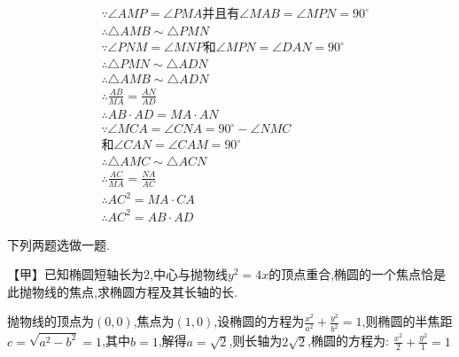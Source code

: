 \begin{questions}
	\begin{solution}
		\begin{align*}
			 & \because \angle{AMP} = \angle{PMA} \text{并且有} \angle{MAB} = \angle{MPN} = 90^\circ \\
			 & \therefore \triangle{AMB} \sim \triangle{PMN}                                      \\
			 & \because \angle{PNM} = \angle{MNP} \text{和} \angle{MPN} = \angle{DAN} = 90^\circ   \\
			 & \therefore \triangle{PMN} \sim \triangle{ADN}                                      \\
			 & \therefore \triangle{AMB} \sim \triangle{ADN}                                      \\
			 & \therefore \frac{AB}{MA} = \frac{AN}{AD}                                           \\
			 & \therefore AB\cdot AD = MA \cdot AN                                                \\
			 & \because \angle{MCA} = \angle{CNA} = 90^\circ - \angle{NMC}                        \\
			 & \text{和} \angle{CAN} = \angle{CAM} = 90^\circ                                      \\
			 & \therefore \triangle{AMC} \sim \triangle{ACN}                                      \\
			 & \therefore \frac{AC}{MA} = \frac{NA}{AC}                                           \\
			 & \therefore AC^2 = MA \cdot CA                                                      \\
			 & \therefore AC^2 = AB \cdot AD
		\end{align*}
	\end{solution}
	\question 下列两题选做一题.

	【甲】已知椭圆短轴长为$2$,中心与抛物线$y^2=4x$的顶点重合,椭圆的一个焦点恰是此抛物线的焦点,求椭圆方程及其长轴的长.
	\begin{solution}
		抛物线的顶点为$(0,0)$,焦点为$(1, 0)$,设椭圆的方程为$\frac{x^2}{a^2} + \frac{y^2}{b^2} =
			1$,则椭圆的半焦距$c=\sqrt{a^2 - b^2} = 1$,其中$b=1$,解得$a=\sqrt{2}$,则长轴为$2\sqrt{2}$,椭圆的方程为:
		\( \frac{x^2}{2} + \frac{y^2}{1} = 1 \)
	\end{solution}


\end{questions}
